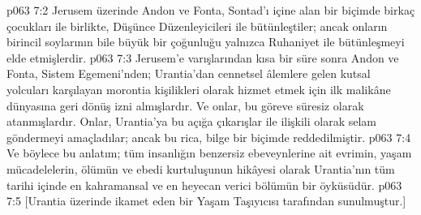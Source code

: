 \vs p063 7:2 Jerusem üzerinde Andon ve Fonta, Sontad’ı içine alan bir biçimde birkaç çocukları ile birlikte, Düşünce Düzenleyicileri ile bütünleştiler; ancak onların birincil soylarının bile büyük bir çoğunluğu yalnızca Ruhaniyet ile bütünleşmeyi elde etmişlerdir.
\vs p063 7:3 Jerusem’e varışlarından kısa bir süre sonra Andon ve Fonta, Sistem Egemeni’nden; Urantia’dan cennetsel âlemlere gelen kutsal yolcuları karşılayan morontia kişilikleri olarak hizmet etmek için ilk malikâne dünyasına geri dönüş izni almışlardır. Ve onlar, bu göreve süresiz olarak atanmışlardır. Onlar, Urantia’ya bu açığa çıkarışlar ile ilişkili olarak selam göndermeyi amaçladılar; ancak bu rica, bilge bir biçimde reddedilmiştir.
\vs p063 7:4 Ve böylece bu anlatım; tüm insanlığın benzersiz ebeveynlerine ait evrimin, yaşam mücadelelerin, ölümün ve ebedi kurtuluşunun hikâyesi olarak Urantia’nın tüm tarihi içinde en kahramansal ve en heyecan verici bölümün bir öyküsüdür.
\vs p063 7:5 [Urantia üzerinde ikamet eden bir Yaşam Taşıyıcısı tarafından sunulmuştur.]
